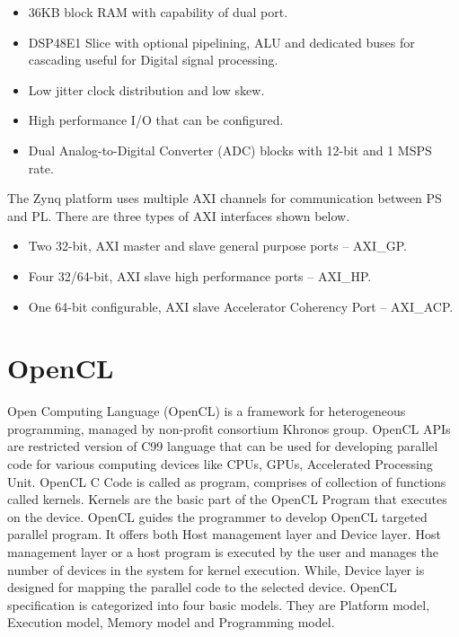 \begin{itemize}\itemsep0em 
	\item 36KB block RAM with capability of dual port.
	\item DSP48E1 Slice with optional pipelining, ALU and dedicated buses for cascading useful for Digital signal processing.
	\item Low jitter clock distribution and low skew.
	\item High performance I/O that can be configured.
	\item Dual Analog-to-Digital Converter (ADC) blocks with 12-bit and 1 MSPS rate.
\end{itemize}

The Zynq platform uses multiple AXI channels for communication between PS and PL. There are three types of AXI interfaces shown below.
\begin{itemize}\itemsep0em 
	\item Two 32-bit, AXI master and slave general purpose ports -- AXI\_GP.
	\item Four 32/64-bit, AXI slave high performance ports -- AXI\_HP.
	\item One 64-bit configurable, AXI slave Accelerator Coherency Port -- AXI\_ACP.
\end{itemize}

\section{OpenCL}
Open Computing Language (OpenCL) is a framework for heterogeneous programming, managed by non-profit consortium Khronos group. OpenCL APIs are restricted version of C99 language that can be used for developing parallel code for various computing devices like CPUs, GPUs, Accelerated Processing Unit. OpenCL C Code is called as program, comprises of collection of functions called kernels. Kernels are the basic part of the OpenCL Program that executes on the device. OpenCL guides the programmer to develop OpenCL targeted parallel program. It offers both Host management layer and Device layer. Host management layer or a host program is executed by the user and manages the number of devices in the system for kernel execution. While, Device layer is designed for mapping the parallel code to the selected device. OpenCL specification is categorized into four basic models. They are Platform model, Execution model, Memory model and Programming model.

